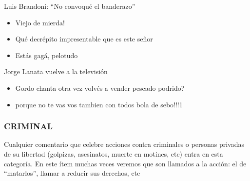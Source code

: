 \begin{displayquote}
     Luis Brandoni: ``No convoqué el banderazo''

    \begin{itemize}
        \item Viejo de mierda!
        \item Qué decrépito impresentable que es este señor
        \item Estás gagá, pelotudo
    \end{itemize}

     Jorge Lanata vuelve a la televisión


    \begin{itemize}

        \item Gordo chanta otra vez volvés a vender pescado podrido?
        \item porque no te vas vos tambien con todos bola de sebo!!!1
    \end{itemize}

\end{displayquote}








\subsubsection{CRIMINAL}

Cualquier comentario que celebre acciones contra criminales o personas privadas de su libertad (golpizas, asesinatos, muerte en motines, etc) entra en esta categoría. En este ítem muchas veces veremos que son llamados a la acción: el de ``matarlos'', llamar a reducir sus derechos, etc


